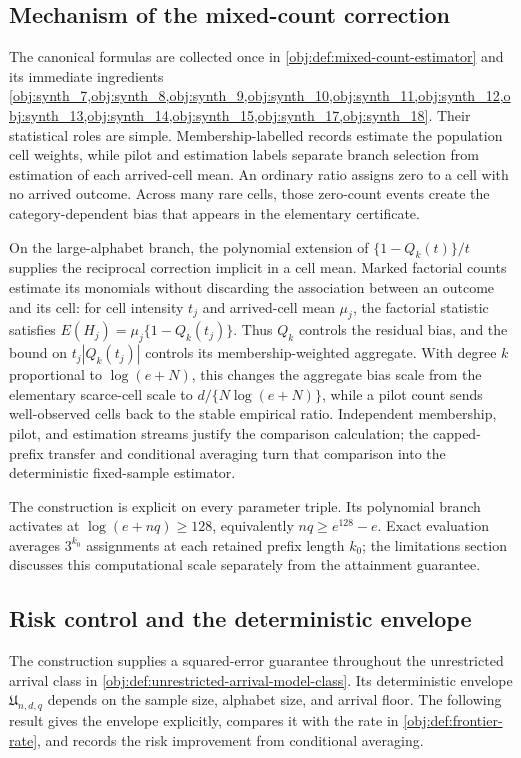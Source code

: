 \documentclass[11pt]{article}
\begin{document}
\subsection{Mechanism of the mixed-count correction}

The canonical formulas are collected once in \cref{obj:def:mixed-count-estimator} and its immediate ingredients \cref{obj:synth_7,obj:synth_8,obj:synth_9,obj:synth_10,obj:synth_11,obj:synth_12,obj:synth_13,obj:synth_14,obj:synth_15,obj:synth_17,obj:synth_18}. Their statistical roles are simple. Membership-labelled records estimate the population cell weights, while pilot and estimation labels separate branch selection from estimation of each arrived-cell mean. An ordinary ratio assigns zero to a cell with no arrived outcome. Across many rare cells, those zero-count events create the category-dependent bias that appears in the elementary certificate.

On the large-alphabet branch, the polynomial extension of \(\{1-Q_k(t)\}/t\) supplies the reciprocal correction implicit in a cell mean. Marked factorial counts estimate its monomials without discarding the association between an outcome and its cell: for cell intensity \(t_j\) and arrived-cell mean \(\mu_j\), the factorial statistic satisfies \(E(H_j)=\mu_j\{1-Q_k(t_j)\}\). Thus \(Q_k\) controls the residual bias, and the bound on \(t_j|Q_k(t_j)|\) controls its membership-weighted aggregate. With degree \(k\) proportional to \(\log(e+N)\), this changes the aggregate bias scale from the elementary scarce-cell scale to \(d/\{N\log(e+N)\}\), while a pilot count sends well-observed cells back to the stable empirical ratio. Independent membership, pilot, and estimation streams justify the comparison calculation; the capped-prefix transfer and conditional averaging turn that comparison into the deterministic fixed-sample estimator.

The construction is explicit on every parameter triple. Its polynomial branch activates at \(\log(e+nq)\ge128\), equivalently \(nq\ge e^{128}-e\). Exact evaluation averages \(3^{k_0}\) assignments at each retained prefix length \(k_0\); the limitations section discusses this computational scale separately from the attainment guarantee.

\subsection{Risk control and the deterministic envelope}

The construction supplies a squared-error guarantee throughout the unrestricted arrival class in \cref{obj:def:unrestricted-arrival-model-class}. Its deterministic envelope \(\mathfrak U_{n,d,q}\) depends on the sample size, alphabet size, and arrival floor. The following result gives the envelope explicitly, compares it with the rate in \cref{obj:def:frontier-rate}, and records the risk improvement from conditional averaging.
\end{document}
